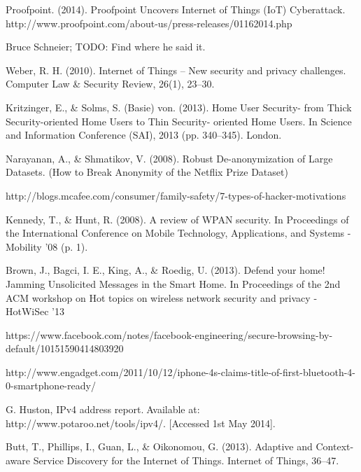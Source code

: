 \documentclass[10pt,journal,compsoc]{IEEEtran}
\begin{document}
\begin{thebibliography}{1}
Proofpoint. (2014). Proofpoint Uncovers Internet of Things (IoT) Cyberattack. http://www.proofpoint.com/about-us/press-releases/01162014.php

Bruce Schneier; TODO: Find where he said it.

Weber, R. H. (2010). Internet of Things – New security and privacy challenges. Computer Law \& Security Review, 26(1), 23–30. 

Kritzinger, E., \& Solms, S. (Basie) von. (2013). Home User Security- from Thick Security-oriented Home Users to Thin Security- oriented Home Users. In Science and Information Conference (SAI), 2013 (pp. 340–345). London.

Narayanan, A., \& Shmatikov, V. (2008). Robust De-anonymization of Large Datasets. (How to Break Anonymity of the Netflix Prize Dataset)

http://blogs.mcafee.com/consumer/family-safety/7-types-of-hacker-motivations

Kennedy, T., \& Hunt, R. (2008). A review of WPAN security. In Proceedings of the International Conference on Mobile Technology, Applications, and Systems - Mobility ’08 (p. 1).

Brown, J., Bagci, I. E., King, A., \& Roedig, U. (2013). Defend your home! Jamming Unsolicited Messages in the Smart Home. In Proceedings of the 2nd ACM workshop on Hot topics on wireless network security and privacy - HotWiSec ’13 

https://www.facebook.com/notes/facebook-engineering/secure-browsing-by-default/10151590414803920

http://www.engadget.com/2011/10/12/iphone-4s-claims-title-of-first-bluetooth-4-0-smartphone-ready/

G. Huston, IPv4 address report.􏰄Available at: http://www.potaroo.net/tools/ipv4/. [Accessed 1st May 2014].

Butt, T., Phillips, I., Guan, L., \& Oikonomou, G. (2013). Adaptive and Context-aware Service Discovery for the Internet of Things. Internet of Things, 36–47. 

\end{thebibliography}



\end{document}
